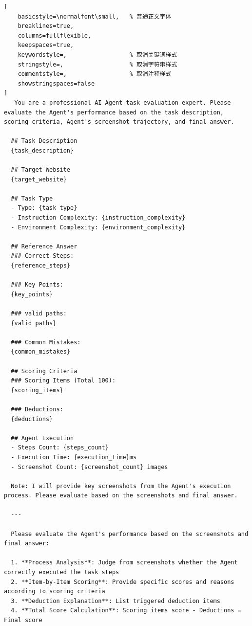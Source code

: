 \begin{tcolorbox}[
  title={Stepwise-Screenshot Evaluation Prompt},
  colback=white,
  colframe=tableblueTitle,
  colbacktitle=tableblueTitle,
  coltitle=white,
  fonttitle=\bfseries,
  breakable,
  enhanced,
  boxrule=1.2pt,
  arc=1.5mm
]


\begin{lstlisting}[
    basicstyle=\normalfont\small,   % 普通正文字体
    breaklines=true,
    columns=fullflexible,
    keepspaces=true,
    keywordstyle=,                  % 取消关键词样式
    stringstyle=,                   % 取消字符串样式
    commentstyle=,                  % 取消注释样式
    showstringspaces=false
]
   You are a professional AI Agent task evaluation expert. Please evaluate the Agent's performance based on the task description, scoring criteria, Agent's screenshot trajectory, and final answer.

  ## Task Description
  {task_description}

  ## Target Website
  {target_website}

  ## Task Type
  - Type: {task_type}
  - Instruction Complexity: {instruction_complexity}
  - Environment Complexity: {environment_complexity}

  ## Reference Answer
  ### Correct Steps:
  {reference_steps}

  ### Key Points:
  {key_points}

  ### valid paths:
  {valid paths}

  ### Common Mistakes:
  {common_mistakes}

  ## Scoring Criteria
  ### Scoring Items (Total 100):
  {scoring_items}

  ### Deductions:
  {deductions}

  ## Agent Execution
  - Steps Count: {steps_count}
  - Execution Time: {execution_time}ms
  - Screenshot Count: {screenshot_count} images

  Note: I will provide key screenshots from the Agent's execution process. Please evaluate based on the screenshots and final answer.

  ---

  Please evaluate the Agent's performance based on the screenshots and final answer:

  1. **Process Analysis**: Judge from screenshots whether the Agent correctly executed the task steps
  2. **Item-by-Item Scoring**: Provide specific scores and reasons according to scoring criteria
  3. **Deduction Explanation**: List triggered deduction items
  4. **Total Score Calculation**: Scoring items score - Deductions = Final score


\end{lstlisting}
\end{tcolorbox}
